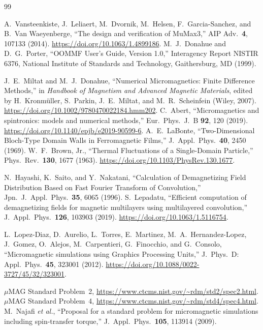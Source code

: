 \documentclass{article}      %
\begin{document}
\begin{thebibliography}{99}

 A.\ Vansteenkiste, J.\ Leliaert, M.\ Dvornik, M.\ Helsen,
  F.\ Garcia-Sanchez, and B.\ Van Waeyenberge, ``The design and verification of
  MuMax3,'' AIP Adv.\ \textbf{4}, 107133 (2014).
  \url{https://doi.org/10.1063/1.4899186}.
 M.\ J.\ Donahue and D.\ G.\ Porter, ``OOMMF User's Guide,
  Version 1.0,'' Interagency Report NISTIR 6376, National Institute of Standards
  and Technology, Gaithersburg, MD (1999).

 J.\ E.\ Miltat and M.\ J.\ Donahue, ``Numerical
  Micromagnetics: Finite Difference Methods,'' in \textit{Handbook of Magnetism
  and Advanced Magnetic Materials}, edited by H.\ Kronm\"uller, S.\ Parkin,
  J.\ E.\ Miltat, and M.\ R.\ Scheinfein (Wiley, 2007).
  \url{https://doi.org/10.1002/9780470022184.hmm202}.
 C.\ Abert, ``Micromagnetics and spintronics: models and
  numerical methods,'' Eur.\ Phys.\ J.\ B \textbf{92}, 120 (2019).
  \url{https://doi.org/10.1140/epjb/e2019-90599-6}.
 A.\ E.\ LaBonte, ``Two-Dimensional Bloch-Type Domain Walls
  in Ferromagnetic Films,'' J.\ Appl.\ Phys.\ \textbf{40}, 2450 (1969).
 W.\ F.\ Brown, Jr., ``Thermal Fluctuations of a Single-Domain
  Particle,'' Phys.\ Rev.\ \textbf{130}, 1677 (1963).
  \url{https://doi.org/10.1103/PhysRev.130.1677}.

 N.\ Hayashi, K.\ Saito, and Y.\ Nakatani, ``Calculation of
  Demagnetizing Field Distribution Based on Fast Fourier Transform of
  Convolution,'' Jpn.\ J.\ Appl.\ Phys.\ \textbf{35}, 6065 (1996).
 S.\ Lepadatu, ``Efficient computation of demagnetizing
  fields for magnetic multilayers using multilayered convolution,'' J.\ Appl.\
  Phys.\ \textbf{126}, 103903 (2019). \url{https://doi.org/10.1063/1.5116754}.

 L.\ Lopez-Diaz, D.\ Aurelio, L.\ Torres, E.\ Martinez,
  M.\ A.\ Hernandez-Lopez, J.\ Gomez, O.\ Alejos, M.\ Carpentieri, G.\ Finocchio,
  and G.\ Consolo, ``Micromagnetic simulations using Graphics Processing Units,''
  J.\ Phys.\ D: Appl.\ Phys.\ \textbf{45}, 323001 (2012).
  \url{https://doi.org/10.1088/0022-3727/45/32/323001}.

 $\mu$MAG Standard Problem~2,
  \url{https://www.ctcms.nist.gov/~rdm/std2/spec2.html}.
 $\mu$MAG Standard Problem~4,
  \url{https://www.ctcms.nist.gov/~rdm/std4/spec4.html}.
 M.\ Najafi \textit{et al.}, ``Proposal for a standard
  problem for micromagnetic simulations including spin-transfer torque,''
  J.\ Appl.\ Phys.\ \textbf{105}, 113914 (2009).


\end{thebibliography}
\end{document}
